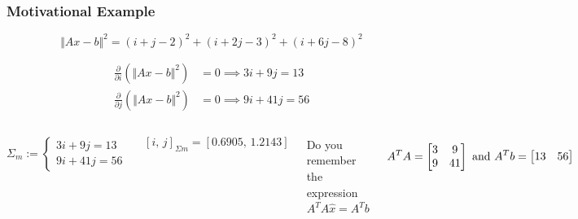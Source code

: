 \documentclass[aspectratio=169]{beamer}
\begin{document}
\begin{frame}[t]
	\frametitle{Motivational Example}  %
	
	\[ \Vert Ax - b  \Vert^2 = (i + j -2)^2 + (i + 2j -3)^2 + (i + 6j -8)^2 \] 

	\begin{align*}
		\frac{\partial}{\partial i}(\Vert Ax - b  \Vert^2 ) &= 0 \implies 3i  + 9j = 13 \\
		\frac{\partial}{\partial j}(\Vert Ax - b  \Vert^2 ) &= 0 \implies 9i + 41 j = 56
	\end{align*}

\begin{columns}	


\[ \Sigma_m := \left\{ \begin{matrix} 3i  + 9j = 13 \\ 9i + 41 j = 56 \end{matrix} \right. \]

\[  [i, \, j]_{\Sigma m} = [0.6905 , \, 1.2143] \]


Do you remember the expression $ A^T A \hat x = A^T b $

\[ A^TA = \begin{bmatrix} 3 & 9 \\ 9 & 41 \end{bmatrix} \textnormal{ and } A^T b =  \begin{bmatrix} 13 & 56 \end{bmatrix} \] 

\end{columns}
\end{frame}
\end{document}

